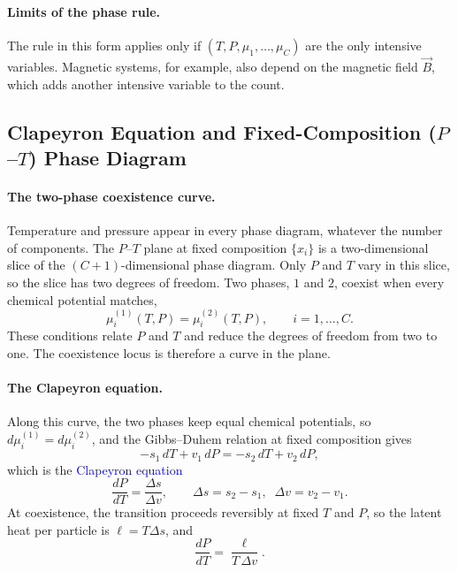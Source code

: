 \paragraph{Limits of the phase rule.}
The rule in this form applies only if $(T,P,\mu_1,\dots,\mu_C)$ are the only
intensive variables. Magnetic systems, for example, also depend on the
magnetic field $\vec B$, which adds another intensive variable to the count.

\subsection{Clapeyron Equation and Fixed-Composition ($P$--$T$) Phase Diagram}

\paragraph{The two-phase coexistence curve.}
Temperature and pressure appear in every phase diagram, whatever the number
of components. The $P$--$T$ plane at fixed composition $\{x_i\}$ is a
two-dimensional slice of the $(C+1)$-dimensional phase diagram. Only $P$
and $T$ vary in this slice, so the slice has two degrees of freedom. Two
phases, $1$ and $2$, coexist when every chemical potential matches,
\begin{equation*}
    \mu_i^{(1)}(T,P) = \mu_i^{(2)}(T,P), \qquad i=1,\dots,C.
\end{equation*}
These conditions relate $P$ and $T$ and reduce the degrees of freedom from
two to one. The coexistence locus is therefore a curve in the plane.

\paragraph{The Clapeyron equation.}
Along this curve, the two phases keep equal chemical potentials, so
$d\mu_i^{(1)}=d\mu_i^{(2)}$, and the Gibbs--Duhem relation at fixed
composition gives
\begin{equation*}
    -s_1\,dT + v_1\,dP = -s_2\,dT + v_2\,dP ,
\end{equation*}
which is the \textcolor{blue}{Clapeyron equation}
\begin{equation}
    \boxed{\frac{dP}{dT}=\frac{\Delta s}{\Delta v}}, \qquad
    \Delta s = s_2-s_1,\;\; \Delta v = v_2-v_1 .
\end{equation}
At coexistence, the transition proceeds reversibly at fixed $T$ and $P$, so
the latent heat per particle is $\ell = T\Delta s$, and
\begin{equation}
    \boxed{\frac{dP}{dT}=\frac{\ell}{T\,\Delta v}.}
\end{equation}


